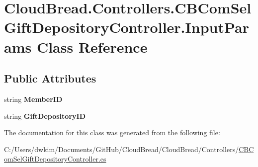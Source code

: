 \hypertarget{class_cloud_bread_1_1_controllers_1_1_c_b_com_sel_gift_depository_controller_1_1_input_params}{}\section{Cloud\+Bread.\+Controllers.\+C\+B\+Com\+Sel\+Gift\+Depository\+Controller.\+Input\+Params Class Reference}
\label{class_cloud_bread_1_1_controllers_1_1_c_b_com_sel_gift_depository_controller_1_1_input_params}
\subsection*{Public Attributes}
\begin{DoxyCompactItemize}
\item 
string {\bfseries Member\+ID}\hypertarget{class_cloud_bread_1_1_controllers_1_1_c_b_com_sel_gift_depository_controller_1_1_input_params_aa81d05e4817dd24ebb8b72902d663c4f}{}\label{class_cloud_bread_1_1_controllers_1_1_c_b_com_sel_gift_depository_controller_1_1_input_params_aa81d05e4817dd24ebb8b72902d663c4f}

\item 
string {\bfseries Gift\+Depository\+ID}\hypertarget{class_cloud_bread_1_1_controllers_1_1_c_b_com_sel_gift_depository_controller_1_1_input_params_a25af83f72b96c2aed31c58af0c3b85ac}{}\label{class_cloud_bread_1_1_controllers_1_1_c_b_com_sel_gift_depository_controller_1_1_input_params_a25af83f72b96c2aed31c58af0c3b85ac}

\end{DoxyCompactItemize}


The documentation for this class was generated from the following file\+:\begin{DoxyCompactItemize}
\item 
C\+:/\+Users/dwkim/\+Documents/\+Git\+Hub/\+Cloud\+Bread/\+Cloud\+Bread/\+Controllers/\hyperlink{_c_b_com_sel_gift_depository_controller_8cs}{C\+B\+Com\+Sel\+Gift\+Depository\+Controller.\+cs}\end{DoxyCompactItemize}
